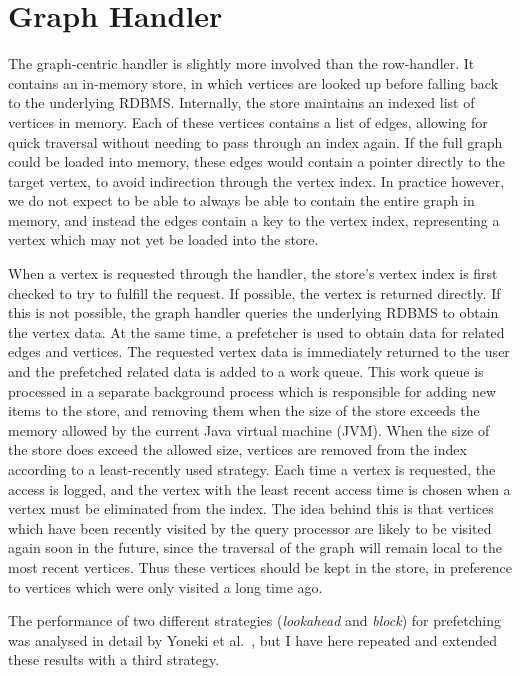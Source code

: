 \section{Graph Handler}
\label{impl:graph}

The graph-centric handler is slightly more involved than the row-handler. 
It contains an in-memory store, in which vertices are looked up before falling back to 
the underlying RDBMS. Internally, the store maintains an indexed list of vertices in
memory. Each of these vertices contains a list of edges, allowing for quick
traversal without needing to pass through an index again. If the full graph
could be loaded into memory, these edges would contain a pointer directly to the
target vertex, to avoid indirection through the vertex index.
In practice however, we do not expect to be able to always be able to contain
the entire graph in memory, and instead the edges contain a key to the vertex index, representing a vertex which may not yet be loaded into the store.

When a vertex is requested through the handler, the store's vertex index is first
checked to try to fulfill the request. If possible, the vertex is returned
directly. If this is not possible, the graph handler queries the underlying
RDBMS to obtain the vertex data. At the same time, a prefetcher is used
to obtain data for related edges and vertices. The requested vertex data is
immediately returned to the user and the prefetched related data
is added to a work queue. This work queue is processed in a separate
background process which is responsible for adding new items to the store, and
removing them when the size of the store exceeds the memory allowed by the current Java
virtual machine (JVM). When the size of the store does exceed the allowed
size, vertices are removed from the index according to a least-recently used
strategy. Each time a vertex is requested, the access is
logged, and the vertex with the
least recent access time is chosen when a vertex must be eliminated from the index. The idea behind this is that vertices
which have  been recently visited by the query processor are likely to be
visited again soon in the future, since the traversal of the graph will remain
local to the most recent vertices. Thus these vertices should be kept in the
store, in preference to vertices which were only visited a long time ago.

The performance of two different strategies (\textit{lookahead} and
\textit{block}) for prefetching was analysed in detail by Yoneki et
al.~\cite{crackle}, but I have here repeated and extended these results with
a third strategy. 

